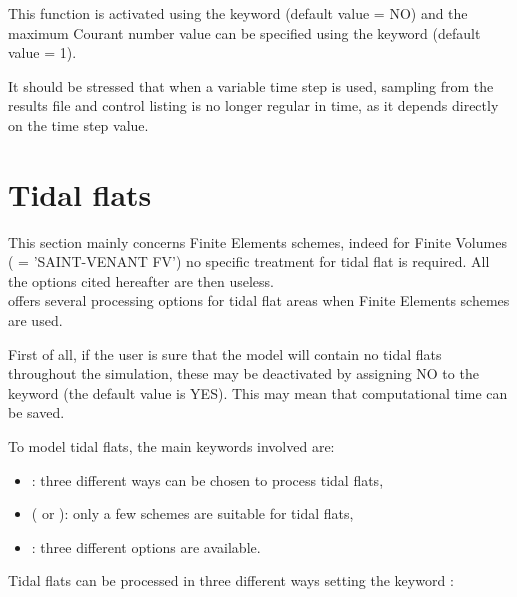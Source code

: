 This function is activated using the keyword 
(default value = NO) and the maximum Courant number value can be specified using
the keyword  (default value = 1).

It should be stressed that when a variable time step is used,
sampling from the results file and control listing is no longer regular in time,
as it depends directly on the time step value.


\section{Tidal flats}
This section mainly concerns Finite Elements schemes, indeed for Finite Volumes
( = 'SAINT-VENANT FV') no specific treatment for tidal flat
is required.
All the options cited hereafter are then useless.\\

 offers several processing options for tidal flat areas
when Finite Elements schemes are used.

First of all, if the user is sure that the model will contain no tidal flats
throughout the simulation, these may be deactivated by assigning NO
to the keyword  (the default value is YES).
This may mean that computational time can be saved.

To model tidal flats, the main keywords involved are:
\begin{itemize}
\item {}:
three different ways can be chosen to process tidal flats,
\item {}
( or ):
only a few schemes are suitable for tidal flats,
\item {}: three different options are
available.
\end{itemize}

Tidal flats can be processed in three different ways setting the keyword
:

